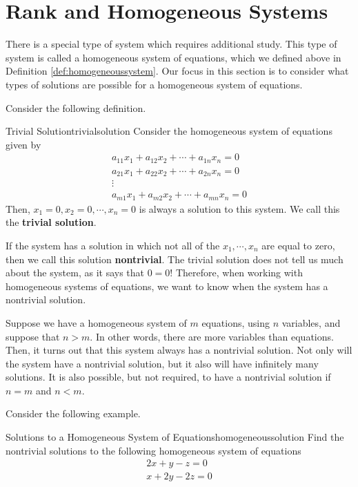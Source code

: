 \section{Rank and Homogeneous Systems}

There is a special type of system which requires additional study. This type of system is called a homogeneous system of
equations, which we defined above in Definition \ref{def:homogeneoussystem}. 
Our focus in this section is to consider what types of solutions are possible for a homogeneous system of equations. 

Consider the following definition. 

\begin{definition}{Trivial Solution}{trivialsolution}
Consider the homogeneous system of equations given by
\begin{equation*}
\begin{array}{c}
a_{11}x_{1}+a_{12}x_{2}+\cdots +a_{1n}x_{n}= 0 \\
a_{21}x_{1}+a_{22}x_{2}+\cdots +a_{2n}x_{n}= 0  \\
\vdots \\
a_{m1}x_{1}+a_{m2}x_{2}+\cdots +a_{mn}x_{n}= 0 
\end{array}
\end{equation*}
Then, $x_{1} = 0, x_{2} = 0, \cdots, x_{n} =0$ is always a 
solution to this system. We call this the \textbf{trivial solution}.
\end{definition}

If the system has a solution in which not all of the $x_1, \cdots, x_n$ are equal to zero,
then we call this solution \textbf{nontrivial}. The trivial solution
does not tell us much about the system, as it says that $0=0$! 
Therefore, when working with homogeneous systems of 
equations, we want to know when the system has a nontrivial solution. 

Suppose we have a homogeneous system of $m$ equations, using $n$ variables, and suppose that
$n > m$. In other words, there are more variables than equations. 
Then, it turns out that this system always has a nontrivial solution. Not only will the
system have a nontrivial solution, but it also will have infinitely many solutions.
It is also possible, but not required, to have a nontrivial solution if $n=m$ and $n<m$.

Consider the following example.

\begin{example}{Solutions to a Homogeneous System of Equations}{homogeneoussolution}
Find the nontrivial solutions to the following homogeneous system of equations
\begin{equation*}
\begin{array}{c}
2x + y - z = 0 \\
x + 2y - 2z = 0
\end{array}
\end{equation*}
\end{example}

